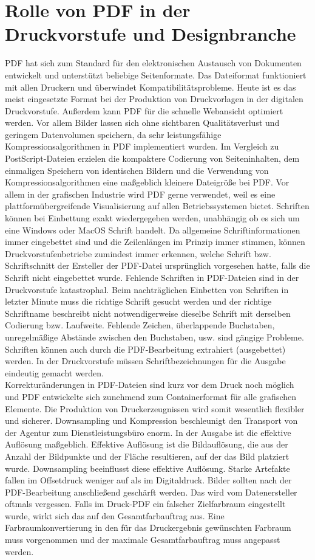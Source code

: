 \section{Rolle von PDF in der Druckvorstufe und Designbranche}
PDF hat sich zum Standard für den elektronischen Austausch von Dokumenten entwickelt und unterstützt beliebige Seitenformate. Das Dateiformat funktioniert mit allen Druckern und überwindet Kompatibilitätsprobleme. Heute ist es das meist eingesetzte Format bei der Produktion von Druckvorlagen in der digitalen Druckvorstufe. Außerdem kann PDF für die schnelle Webansicht optimiert werden. Vor allem Bilder lassen sich ohne sichtbaren Qualitätsverlust und geringem Datenvolumen speichern, da sehr leistungsfähige Kompressionsalgorithmen in PDF implementiert wurden. Im Vergleich zu PostScript-Dateien erzielen die kompaktere Codierung von Seiteninhalten, dem einmaligen Speichern von identischen Bildern und die Verwendung von Kompressionsalgorithmen eine maßgeblich kleinere Dateigröße bei PDF. Vor allem in der grafischen Industrie wird PDF gerne verwendet, weil es eine plattformübergreifende Visualisierung auf allen Betriebssystemen bietet. Schriften können bei Einbettung exakt wiedergegeben werden, unabhängig ob es sich um eine Windows oder MacOS Schrift handelt. Da allgemeine Schriftinformationen immer eingebettet sind und die Zeilenlängen im Prinzip immer stimmen, können Druckvorstufenbetriebe zumindest immer erkennen, welche Schrift bzw. Schriftschnitt der Ersteller der PDF-Datei ursprünglich vorgesehen hatte, falls die Schrift nicht eingebettet wurde. Fehlende Schriften in PDF-Dateien sind in der Druckvorstufe katastrophal. Beim nachträglichen Einbetten von Schriften in letzter Minute muss die richtige Schrift gesucht werden und der richtige Schriftname beschreibt nicht notwendigerweise dieselbe Schrift mit derselben Codierung bzw. Laufweite. Fehlende Zeichen, überlappende Buchstaben, unregelmäßige Abstände zwischen den Buchstaben, usw. sind gängige Probleme. Schriften können auch durch die PDF-Bearbeitung extrahiert (ausgebettet) werden. In der Druckvorstufe müssen Schriftbezeichnungen für die Ausgabe eindeutig gemacht werden. \\
Korrekturänderungen in PDF-Dateien sind kurz vor dem Druck noch möglich und PDF entwickelte sich zunehmend zum Containerformat für alle grafischen Elemente. Die Produktion von Druckerzeugnissen wird somit wesentlich flexibler und sicherer. Downsampling und Kompression beschleunigt den Transport von der Agentur zum Dienstleistungsbüro enorm. In der Ausgabe ist die effektive Auflösung maßgeblich. Effektive Auflösung ist die Bildauflösung, die aus der Anzahl der Bildpunkte und der Fläche resultieren, auf der das Bild platziert wurde. Downsampling beeinflusst diese effektive Auflösung. Starke Artefakte fallen im Offsetdruck weniger auf als im Digitaldruck. Bilder sollten nach der PDF-Bearbeitung anschließend geschärft werden. Das wird vom Datenersteller oftmals vergessen. Falls im Druck-PDF ein falscher Zielfarbraum eingestellt wurde, wirkt sich das auf den Gesamtfarbauftrag aus. Eine Farbraumkonvertierung in den für das Druckergebnis gewünschten Farbraum muss vorgenommen und der maximale Gesamtfarbauftrag muss angepasst werden. \\ 
